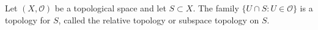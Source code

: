 Let $(X, \mathcal{O})$ be a topological space and let $S \subset X$. The family $\{U \cap S : U \in \mathcal{O}\}$ is a topology for $S$, called the relative topology or subspace topology on $S$.
